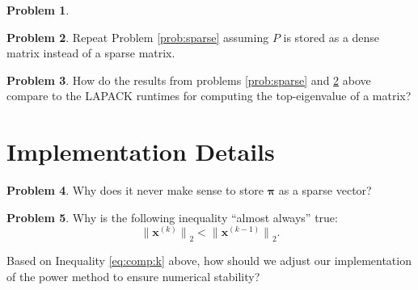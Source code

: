 \documentclass[10pt]{article}
\theoremstyle{definition}
\newtheorem{problem}{Problem}
\newcommand{\p}{\mathbf P}
\newcommand{\pb}{\bar {\p}}
\newcommand{\pbb}{\bar {\pb}}
\newcommand{\pr}{\bm \pi}
\newcommand{\x}{\mathbf x}
\newcommand{\ltwo}[1]{{\lVert {#1} \rVert}_2}
\begin{document}
\begin{problem}
\begin{enumerate}

            \newpage
    \end{enumerate}
\end{problem}
\newpage
\begin{problem}
    \label{prob:dense}
    Repeat Problem \ref{prob:sparse} assuming $P$ is stored as a dense matrix instead of a sparse matrix.
\end{problem}

\newpage
\begin{problem}
    How do the results from problems \ref{prob:sparse} and \ref{prob:dense} above compare to the LAPACK runtimes for computing the top-eigenvalue of a matrix?
\end{problem}

\newpage
\section{Implementation Details}
\begin{problem}
        Why does it never make sense to store $\pr$ as a sparse vector?
\end{problem}

\newpage
\begin{problem}
            Why is the following inequality ``almost always'' true:
            \begin{equation}
                \label{eq:comp:k}
                \ltwo{\x^{(k)}} < \ltwo{\x^{(k-1)}}
                .
            \end{equation}
            \vspace{4in}

            Based on Inequality \eqref{eq:comp:k} above,
            how should we adjust our implementation of the power method to ensure numerical stability?
\end{problem}

\end{document}
